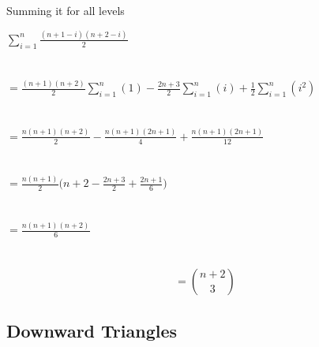 \documentclass[12pt]{article}
\begin{document}
 Summing it for all levels
 
 $\displaystyle\sum_{i=1}^{n} \frac{(n+1-i)(n+2-i)}{2}$
 \\ \\ \\
 $\displaystyle= \frac{(n+1)(n+2)}{2} \displaystyle\sum_{i=1}^{n} (1) - \frac{2n+3}{2} \displaystyle\sum_{i=1}^{n} (i) + \frac{1}{2} \displaystyle\sum_{i=1}^{n} (i^{2})$
 \\ \\ \\
 $\displaystyle= \frac{n(n+1)(n+2)}{2} - \frac{n(n+1)(2n+1)}{4} + \frac{n(n+1)(2n+1)}{12} $
 \\ \\ \\
 $\displaystyle= \frac{n(n+1)}{2}\bigg(n+2 - \frac{2n+3}{2} + \frac{2n+1}{6}\bigg)$
 \\ \\ \\
 $\displaystyle= \frac{n(n+1)(n+2)}{6}$
 \\ \\ \\
 \begin{equation}\label{eq:up}
  = \binom{n+2}{3}
 \end{equation}

 \subsection{\color{blue}Downward Triangles}
 
\end{document}
